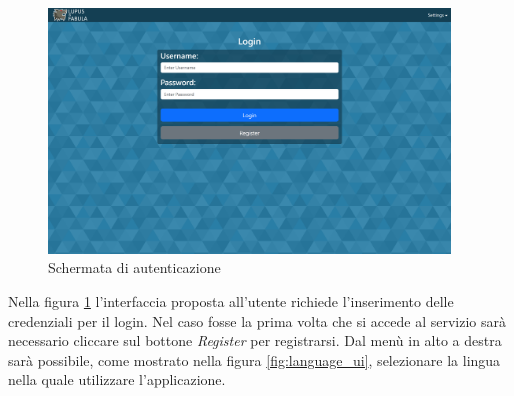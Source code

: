 \begin{figure}[H]
\begin{minipage}{0.25\textwidth}
    \end{minipage}\hfill
    \begin{minipage}{0.75\textwidth}
        \centering
        \includegraphics[width=0.95\textwidth]{img/screen/desktop/login_desktop.png}
    \end{minipage}
    \caption{Schermata di autenticazione}
    \label{fig:login_ui}
\end{figure}

Nella figura \ref{fig:login_ui} l'interfaccia proposta all'utente richiede l'inserimento delle credenziali per il login. Nel caso fosse la prima volta che si accede al servizio sarà necessario cliccare sul bottone \emph{Register} per registrarsi. Dal menù in alto a destra sarà possibile, come mostrato nella figura \ref{fig:language_ui}, selezionare la lingua nella quale utilizzare l'applicazione.


